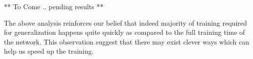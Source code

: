 ** To Come .. pending results **

\setlength{\tabcolsep}{1pt}
\begin{table}[t!]
\begin{center}
\caption{Performance of 50-50 network for detection on pascal-voc-2007 challenge. (l5 is conv-5 and l7 is fc-7)}
\label{table:det-trajectory}
\end{center}
\end{table}
\setlength{\tabcolsep}{1.4pt}
The above analysis reinforces our belief that indeed majority of training required for generalization happens quite quickly as compared to the full training time of the network. This observation suggest that there may exist clever ways which can help us speed up the training.

